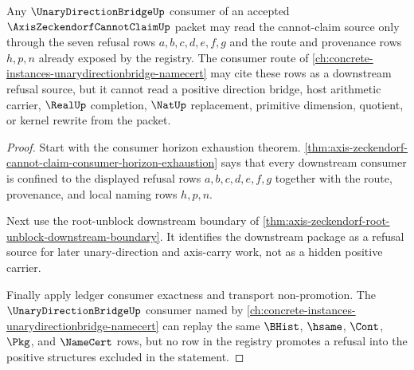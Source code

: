 \begin{theorem}
\label{thm:axis-zeckendorf-cannot-claim-downstream-route-refusal}
Any $\UnaryDirectionBridgeUp$ consumer of an accepted $\AxisZeckendorfCannotClaimUp$ packet may read the cannot-claim source only through the seven refusal rows $a,b,c,d,e,f,g$ and the route and provenance rows $h,p,n$ already exposed by the registry. The consumer route of \autoref{ch:concrete-instances-unarydirectionbridge-namecert} may cite these rows as a downstream refusal source, but it cannot read a positive direction bridge, host arithmetic carrier, $\RealUp$ completion, $\NatUp$ replacement, primitive dimension, quotient, or kernel rewrite from the packet.
\end{theorem}
\begin{proof}
Start with the consumer horizon exhaustion theorem. \autoref{thm:axis-zeckendorf-cannot-claim-consumer-horizon-exhaustion} says that every downstream consumer is confined to the displayed refusal rows $a,b,c,d,e,f,g$ together with the route, provenance, and local naming rows $h,p,n$.

Next use the root-unblock downstream boundary of \autoref{thm:axis-zeckendorf-root-unblock-downstream-boundary}. It identifies the downstream package as a refusal source for later unary-direction and axis-carry work, not as a hidden positive carrier.

Finally apply ledger consumer exactness and transport non-promotion. The $\UnaryDirectionBridgeUp$ consumer named by \autoref{ch:concrete-instances-unarydirectionbridge-namecert} can replay the same $\BHist$, $\hsame$, $\Cont$, $\Pkg$, and $\NameCert$ rows, but no row in the registry promotes a refusal into the positive structures excluded in the statement.
\end{proof}

